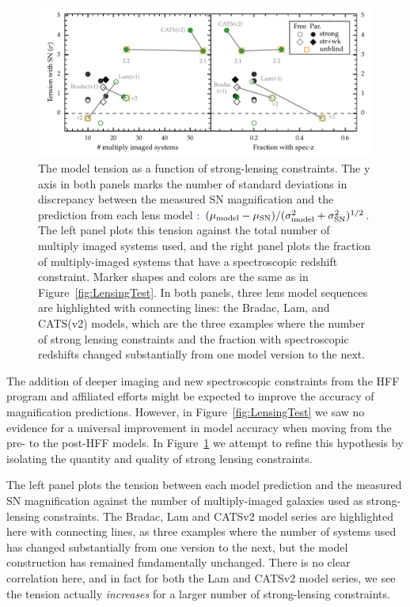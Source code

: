 \documentclass[iop]{emulateapj}
\newcommand{\change}[1]{{ \textcolor{blue}{#1}}}
\newcommand{\change}[1]{#1}
\begin{document}
\begin{figure}
\begin{center}
\includegraphics[width=\textwidth]{tension}
\caption{ \label{fig:Nspecz}
The model tension as a function of strong-lensing constraints. The y
axis in both panels marks the number of standard deviations in
discrepancy between the measured SN magnification and the prediction
from each lens model\change{: $(\mu_{\rm model}-\mu_{\rm SN})/(\sigma_{\rm model}^2 + \sigma_{\rm SN}^2)^{1/2}$.}  The left panel plots this tension against the
total number of multiply imaged systems used, and the right panel
plots the fraction of
multiply-imaged systems that have a spectroscopic redshift
constraint.  Marker shapes and colors are the same as in
Figure~\ref{fig:LensingTest}.  In both panels, three lens model sequences are highlighted with connecting lines: the Bradac, Lam, and CATS(v2) models, which are the three examples where the number of strong lensing constraints and the fraction with spectroscopic redshifts changed substantially from one model version to the next.}
\end{center}
\end{figure}

The addition of deeper imaging and new spectroscopic constraints from
the HFF program and affiliated efforts might be expected to improve
the accuracy of magnification predictions. However, in
Figure~\ref{fig:LensingTest} we saw no evidence for a universal
improvement in model accuracy when moving from the pre- to the
post-HFF models.  In Figure~\ref{fig:Nspecz} we attempt to refine this
hypothesis by isolating the quantity and quality of strong lensing constraints. 

The left panel plots the tension between each model prediction and the
measured SN magnification against the number of multiply-imaged
galaxies used as strong-lensing constraints. The Bradac, Lam and
CATSv2 model series are highlighted here with connecting lines, as
three examples where the number of systems used has changed
substantially from one version to the next, but the model construction
has remained fundamentally unchanged.
There is no clear correlation here, and in
fact for both the Lam and CATSv2 model series, we see the tension
actually {\it increases} for a larger number of strong-lensing constraints.
\end{document}
